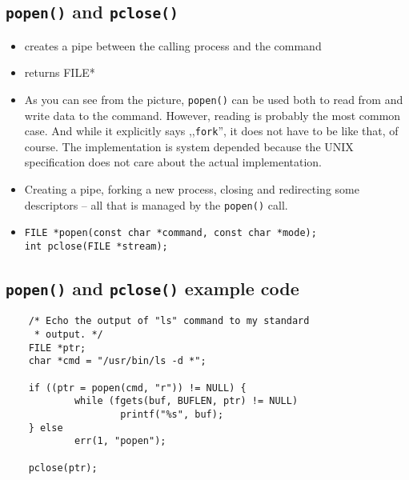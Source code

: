 \subsection{\texttt{popen()} and \texttt{pclose()}}

\begin{itemize}
\item creates a pipe between the calling process and the command
\item returns FILE*
\end{itemize}

\begin{center}
\end{center}


\begin{itemize}
\item As you can see from the picture, \texttt{popen()} can be used both to read
from and write data to the command. However, reading is probably the most common
case. And while it explicitly says ,,\texttt{fork}'', it does not have to be
like that, of course. The implementation is system depended because the UNIX
specification does not care about the actual implementation.
\item Creating a pipe, forking a new process, closing and redirecting some
descriptors -- all that is managed by the \texttt{popen()} call.
\item \texttt{FILE *popen(const char *command, const char *mode);}\\
\texttt{int pclose(FILE *stream);}
\end{itemize}

\subsection{\texttt{popen()} and \texttt{pclose()} example code}

\begin{lstlisting}
    /* Echo the output of "ls" command to my standard
     * output. */
    FILE *ptr;
    char *cmd = "/usr/bin/ls -d *";

    if ((ptr = popen(cmd, "r")) != NULL) {
            while (fgets(buf, BUFLEN, ptr) != NULL)
                    printf("%s", buf);
    } else
            err(1, "popen");

    pclose(ptr);
\end{lstlisting}

